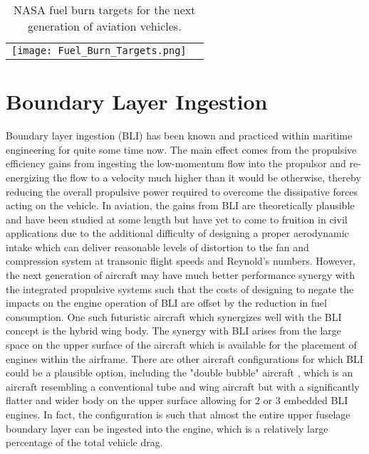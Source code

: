 \begin{table}[ht]
\caption{NASA fuel burn targets for the next generation of aviation vehicles. \cite{Kestner2011}}
\centering
\begin{tabular}{cc}
\texttt{[image: Fuel\_Burn\_Targets.png]}
\end{tabular}
\label{Fuel_Burn_Targets}
\end{table}

\section{Boundary Layer Ingestion}
Boundary layer ingestion (BLI) has been known and practiced within maritime engineering for quite some time now. The main effect comes from the propulsive efficiency gains from ingesting the low-momentum flow into the propulsor and re-energizing the flow to a velocity much higher than it would be otherwise, thereby reducing the overall propulsive power required to overcome the dissipative forces acting on the vehicle. In aviation, the gains from BLI are theoretically plausible and have been studied at some length but have yet to come to fruition in civil applications due to the additional difficulty of designing a proper aerodynamic intake which can deliver reasonable levels of distortion to the fan and compression system at transonic flight speeds and Reynold's numbers. However, the next generation of aircraft may have much better performance synergy with the integrated propulsive systems such that the costs of designing to negate the impacts on the engine operation of BLI are offset by the reduction in fuel consumption. One such futuristic aircraft which synergizes well with the BLI concept is the hybrid wing body. The synergy with BLI arises from the large space on the upper surface of the aircraft which is available for the placement of engines within the airframe. There are other aircraft configurations for which BLI could be a plausible option, including the "double bubble" aircraft \cite{Greitzer2010}, which is an aircraft resembling a conventional tube and wing aircraft but with a significantly flatter and wider body on the upper surface allowing for 2 or 3 embedded BLI engines. In fact, the configuration is such that almost the entire upper fuselage boundary layer can be ingested into the engine, which is a relatively large percentage of the total vehicle drag.  

